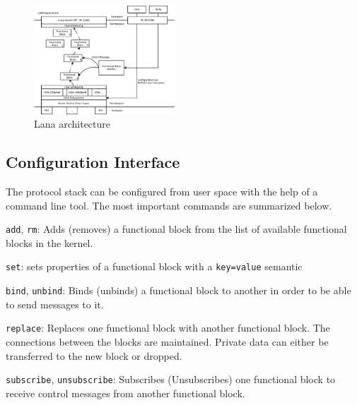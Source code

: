 \documentclass{sig-alternate}
\begin{document}
\begin{figure}
\centering
\includegraphics[width=0.47\textwidth]{figures/architecture.pdf}
\caption{Lana architecture}
\label{fig:architecture}
\end{figure}


\subsection{Configuration Interface}
The protocol stack can be configured from user space with the help of a command line tool. The most important commands are summarized below.
\begin{compactitem}
\item \texttt{add}, \texttt{rm}: Adds (removes) a functional block from the list of available functional blocks in the kernel. 
\item \texttt{set}: sets properties of a functional block with a \texttt{key=value} semantic
\item \texttt{bind}, \texttt{unbind}: Binds (unbinds) a functional block to another in order to be able to send messages to it. 
\item \texttt{replace}: Replaces one functional block with another functional block. The connections between the blocks are maintained. Private data can either be transferred to the new block or dropped.
\item \texttt{subscribe}, \texttt{unsubscribe}: Subscribes (Unsubscribes) one functional block to receive control messages from another functional block.
\end{compactitem}
\end{document}
